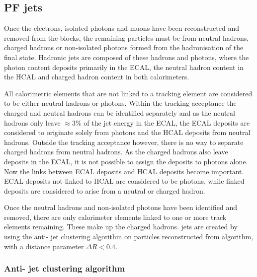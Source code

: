 
\subsection{PF jets} %
\label{sub:pf_jets}

Once the electrons, isolated photons and muons have been reconstructed and removed from the \PF{} blocks, the remaining particles must be from neutral hadrons, charged hadrons or non-isolated photons formed from the hadronisation of the final state.
Hadronic jets are composed of these hadrons and photons, where the photon content deposits primarily in the ECAL, the neutral hadron content in the HCAL and charged hadron content in both calorimeters.

All calorimetric \PF{} elements that are not linked to a tracking element are considered to be either neutral hadrons or photons.
Within the tracking acceptance the charged and neutral hadrons can be identified separately and as the neutral hadrons only leave $\approx3\%$ of the jet energy in the ECAL, the ECAL deposits are considered to originate solely from photons and the HCAL deposits from neutral hadrons.
Outside the tracking acceptance however, there is no way to separate charged hadrons from neutral hadrons.
As the charged hadrons also leave deposits in the ECAL, it is not possible to assign the deposits to photons alone.
Now the links between ECAL deposits and HCAL deposits become important. 
ECAL deposits not linked to HCAL are considered to be photons, while linked deposits are considered to arise from a neutral or charged hadron.

Once the neutral hadrons and non-isolated photons have been identified and removed, there are only calorimeter elements linked to one or more track elements remaining.
These make up the charged hadrons.
\PF{} jets are created by using the anti-\kt{} jet clustering algorithm on particles reconstructed from \PF{} algorithm, with a distance parameter $\Delta R<0.4$.

\subsubsection{Anti-\kt{} jet clustering algorithm} %
\label{ssub:antikt}

